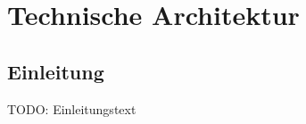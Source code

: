 \chapter{Technische Architektur}

\section{Einleitung}
TODO: Einleitungstext

\newpage


\newpage


\newpage






